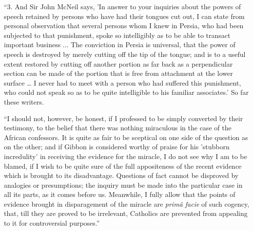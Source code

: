 ``3. And Sir John McNeil says, 'In answer to
your inquiries about the powers of speech retained by persons who have
had their tongues cut out, I can state from personal observation that
several persons whom I knew in Persia, who had been subjected to that
punishment, spoke so intelligibly as to be able to transact important
business ... The conviction in Persia is universal, that the power of
speech is destroyed by merely cutting off the tip of the tongue; and
is to a useful extent restored by cutting off another portion as far
back as a perpendicular section can be made of the portion that is
free from attachment at the lower surface … I never had to meet with
a person who had suffered this punishment, who could not speak so as
to be quite intelligible to his familiar associates.' So far these
writers.

``I should not, however, be honest, if I
professed to be simply converted by their testimony, to the belief
that there was nothing miraculous in the case of the African
confessors. It is quite as fair to be sceptical on one side of the
question as on the other; and if Gibbon is considered worthy of
praise for his 'stubborn incredulity' in receiving the evidence for
the miracle, I do not see why I am to be blamed, if I wish to be quite
sure of the full appositeness of the recent evidence which is brought
to its disadvantage. Questions of fact cannot be disproved by
analogies or presumptions; the inquiry must be made into the
particular case in all its parts, as it comes before us. Meanwhile, I
fully allow that the points of evidence brought in disparagement of
the miracle are \emph{primâ facie} of such cogency, that, till they
are proved to be irrelevant, Catholics are prevented from appealing to
it for controversial purposes.''
